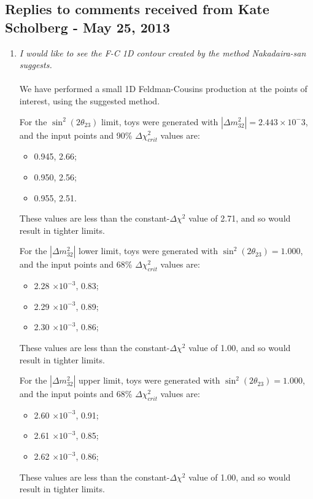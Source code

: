 \subsection{Replies to comments received from Kate Scholberg - May 25, 2013}

\begin{enumerate}

\vspace{5 mm}
\item
{\em
  I would like to see the F-C 1D contour created by the method Nakadaira-san suggests.
}\\
\\
We have performed a small 1D Feldman-Cousins production at the points of interest,
using the suggested method.

For the $\sin^2(2\theta_{23})$ limit, toys were generated with 
$|\Delta m^2_{32}| = 2.443 \times 10^-3$, and the input points and 90\% $\Delta \chi^2_{crit}$ values are:
\begin{itemize}
\item 0.945, 2.66;
\item 0.950, 2.56;
\item 0.955, 2.51.
\end{itemize}
These values are less than the constant-$\Delta \chi^2$ value of 2.71, and so would result in tighter limits.

For the $|\Delta m^2_{32}|$ lower limit, toys were generated with 
$\sin^2(2\theta_{23}) = 1.000$, and the input points and 68\% $\Delta \chi^2_{crit}$ values are:
\begin{itemize}
\item 2.28 $\times 10^{-3}$, 0.83;
\item 2.29 $\times 10^{-3}$, 0.89;
\item 2.30 $\times 10^{-3}$, 0.86;
\end{itemize}
These values are less than the constant-$\Delta \chi^2$ value of 1.00, and so would result in tighter limits.

For the $|\Delta m^2_{32}|$ upper limit, toys were generated with 
$\sin^2(2\theta_{23}) = 1.000$, and the input points and 68\% $\Delta \chi^2_{crit}$ values are:
\begin{itemize}
\item 2.60 $\times 10^{-3}$, 0.91;
\item 2.61 $\times 10^{-3}$, 0.85;
\item 2.62 $\times 10^{-3}$, 0.86;
\end{itemize}
These values are less than the constant-$\Delta \chi^2$ value of 1.00, and so would result in tighter limits.


\end{enumerate}
